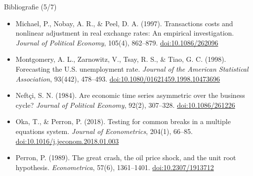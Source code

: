 \begin{frame}{Bibliografie (5/7)}
\begin{itemize}
    \item Michael, P., Nobay, A. R., \& Peel, D. A. (1997). Transactions costs and nonlinear adjustment in real exchange rates: An empirical investigation. \textit{Journal of Political Economy}, 105(4), 862--879. \href{https://doi.org/10.1086/262096}{doi:10.1086/262096}
    \item Montgomery, A. L., Zarnowitz, V., Tsay, R. S., \& Tiao, G. C. (1998). Forecasting the U.S. unemployment rate. \textit{Journal of the American Statistical Association}, 93(442), 478--493. \href{https://doi.org/10.1080/01621459.1998.10473696}{doi:10.1080/01621459.1998.10473696}
    \item Neftçi, S. N. (1984). Are economic time series asymmetric over the business cycle? \textit{Journal of Political Economy}, 92(2), 307--328. \href{https://doi.org/10.1086/261226}{doi:10.1086/261226}
    \item Oka, T., \& Perron, P. (2018). Testing for common breaks in a multiple equations system. \textit{Journal of Econometrics}, 204(1), 66--85. \href{https://doi.org/10.1016/j.jeconom.2018.01.003}{doi:10.1016/j.jeconom.2018.01.003}
    \item Perron, P. (1989). The great crash, the oil price shock, and the unit root hypothesis. \textit{Econometrica}, 57(6), 1361--1401. \href{https://doi.org/10.2307/1913712}{doi:10.2307/1913712}
\end{itemize}
\end{frame}

